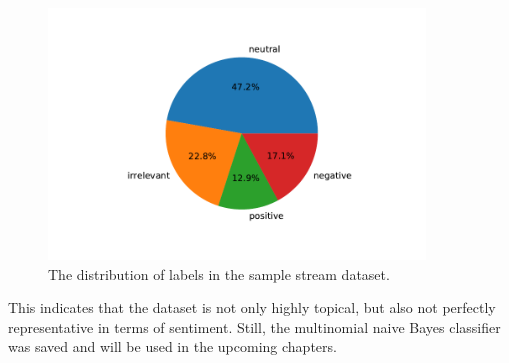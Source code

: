 \begin{figure}
    \centering
    \caption{The distribution of labels in the sample stream dataset.}
    \label{fig:sample_sentiment}
    \includegraphics[width=10cm]{../figures/sample_sentiment.pdf}
\end{figure}

This indicates that the dataset is not only highly topical, but also not perfectly representative in terms of sentiment.
Still, the multinomial naive Bayes classifier was saved and will be used in the upcoming chapters.
